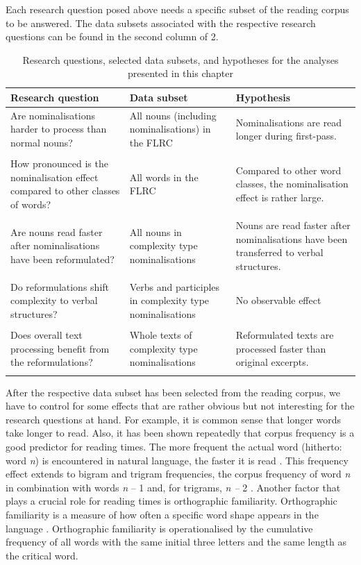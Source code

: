 \documentclass[output=paper]{langsci/langscibook}
\begin{document}
Each research question posed above needs a specific subset of the reading corpus to be answered. The data subsets associated with the respective research questions can be found in the second column of 2.

\begin{table}
\begin{tabularx}{\textwidth}{XXX}
\lsptoprule
 Research question & Data subset & Hypothesis\\
\midrule 
 Are nominalisations harder to process than normal nouns? & All nouns (including nominalisations) in the FLRC & Nominalisations are read longer during first-pass.\\ \\
 How pronounced is the nominalisation effect compared to other classes of words? & All words in the FLRC & Compared to other word classes, the nominalisation effect is rather large.\\ \\
 Are nouns read faster after nominalisations have been reformulated? & All nouns in complexity type nominalisations & Nouns are read faster after nominalisations have been transferred to verbal structures.\\ \\
 Do reformulations shift complexity to verbal structures? & Verbs and participles in complexity type nominalisations & No observable effect\\ \\
 Does overall text processing benefit from the reformulations? & Whole texts of complexity type nominalisations & Reformulated texts are processed faster than original excerpts.\\
\lspbottomrule
\end{tabularx}
\caption{Research questions, selected data subsets, and hypotheses for the analyses presented in this chapter}
\label{wolfer:tab:2}
\end{table}
After the respective data subset has been selected from the reading corpus, we have to control for some effects that are rather obvious but not interesting for the research questions at hand. For example, it is common sense that longer words take longer to read. Also, it has been shown repeatedly that corpus frequency is a good predictor for reading times. The more frequent the actual word (hitherto: word \textit{n}) is encountered in natural language, the faster it is read \citep[cf. ][]{Kliegl2004}. This frequency effect extends to bigram and trigram frequencies, the corpus frequency of word \textit{n }in combination with words \textit{n }– 1 and, for trigrams, \textit{n – }2 \citep[cf. ][]{Boston2008}. Another factor that plays a crucial role for reading times is orthographic familiarity. Orthographic familiarity is a measure of how often a specific word shape appears in the language \citep[cf. ][]{White2008}. Orthographic familiarity is operationalised by the cumulative frequency of all words with the same initial three letters and the same length as the critical word. 
\end{document}
